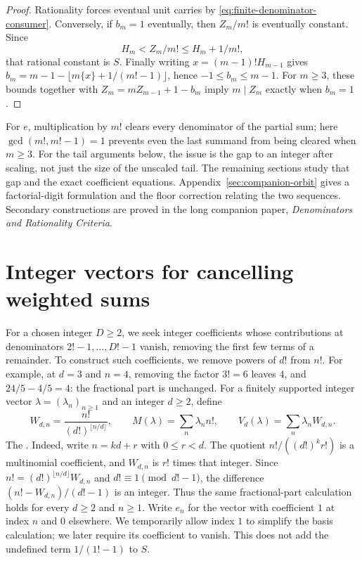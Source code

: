 \documentclass[11pt]{article}
\begin{document}
\begin{proof}
Rationality forces eventual unit carries by
\eqref{eq:finite-denominator-consumer}.  Conversely, if $b_m=1$
eventually, then $Z_m/m!$ is eventually constant.  Since
\[
H_m<Z_m/m!\le H_m+1/m!,
\]
that rational constant is $S$.  Finally writing $x=(m-1)!H_{m-1}$ gives
$b_m=m-1-\lfloor m\{x\}+1/(m!-1)\rfloor$, hence
$-1\le b_m\le m-1$.  For $m\ge3$, these bounds together with
$Z_m=mZ_{m-1}+1-b_m$ imply $m\mid Z_m$ exactly when $b_m=1$.
\end{proof}

For $e$, multiplication by $m!$ clears every denominator of the partial
sum; here $\gcd(m!,m!-1)=1$ prevents even the last summand from being
cleared when $m\ge3$. For the tail arguments below, the issue is the gap to an integer after
scaling, not just the size of the unscaled tail. The remaining
sections study that gap and the exact coefficient equations.
Appendix~\ref{sec:companion-orbit} gives a factorial-digit formulation and
the floor correction relating the two sequences. Secondary constructions
are proved in the long companion paper,
\emph{Denominators and Rationality Criteria}.

\section{Integer vectors for cancelling weighted sums}\label{sec:channels}

For a chosen integer $D\ge2$, we seek integer coefficients whose
contributions at denominators $2!-1,\ldots,D!-1$ vanish, removing the
first few terms of a remainder. To construct such coefficients, we remove powers of $d!$ from $n!$.
For example, at $d=3$ and $n=4$, removing the factor $3!=6$ leaves $4$,
and $24/5-4/5=4$: the fractional part is unchanged.
For a finitely supported integer vector $\lambda=(\lambda_n)_{n\ge1}$ and
an integer $d\ge2$, define
\[
W_{d,n}=\frac{n!}{(d!)^{\lfloor n/d\rfloor}},\qquad
M(\lambda)=\sum_n\lambda_n n!,\qquad
V_d(\lambda)=\sum_n\lambda_nW_{d,n}.
\]
The
.
Indeed, write $n=kd+r$ with $0\le r<d$. The quotient
$n!/((d!)^k r!)$ is a multinomial coefficient, and $W_{d,n}$ is $r!$
times that integer. Since $n!=(d!)^{\lfloor n/d\rfloor}W_{d,n}$ and $d!\equiv1\pmod{d!-1}$,
the difference $(n!-W_{d,n})/(d!-1)$ is an integer. Thus the same
fractional-part calculation holds for every $d\ge2$ and $n\ge1$.
Write $e_n$ for the vector with coefficient $1$ at index $n$ and $0$
elsewhere. We temporarily allow index $1$ to simplify the basis calculation;
we later require its coefficient to vanish. This does not add the undefined
term $1/(1!-1)$ to $S$.
\end{document}
